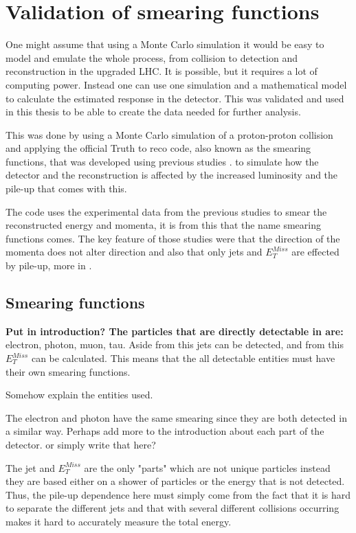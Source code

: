 \chapter{Validation of smearing functions}\label{cha:vali}
One might assume that using a Monte Carlo simulation it would be easy to model and emulate the whole process, from collision to detection and reconstruction in the upgraded LHC. It is possible, but it requires a lot of computing power. Instead one can use one simulation and a mathematical model to calculate the estimated response in the detector. This was validated and used in this thesis to be able to create the data needed for further analysis. 

This was done by using a Monte Carlo simulation of a proton-proton collision and applying the official Truth to reco code, also known as the smearing functions, that was developed using previous studies \citep{ATLAS:LOI2, ATL-PHYS-PUB-2013-004}. to simulate how the detector and the reconstruction is affected by the increased luminosity and the pile-up that comes with this.

The code uses the experimental data from the previous studies to smear the reconstructed energy and momenta, it is from this that the name smearing functions comes.
The key feature of those studies were that the direction of the momenta does not alter direction and also that only jets and $E^{Miss}_T$ are effected by pile-up, more in .

\newpage
\section{Smearing functions}\label{sec:smear}
\textbf{Put in introduction? The particles that are directly detectable in \abbrATLAS are:} electron, photon, muon, tau. Aside from this jets can be detected, and from this $E_T^{Miss}$ can be calculated. This means that the all detectable entities must have their own smearing functions.

Somehow explain the entities used. 

The electron and photon have the same smearing since they are both detected in a similar way.  Perhaps add more to the introduction about each part of the detector. or simply write that here?

The jet and $E^{Miss}_T$ are the only "parts" which are not unique particles instead they are based either on a shower of particles or the energy that is not detected. Thus, the pile-up dependence here must simply come from the fact that it is hard to separate the different jets and that with several different collisions occurring makes it hard to accurately measure the total energy.


